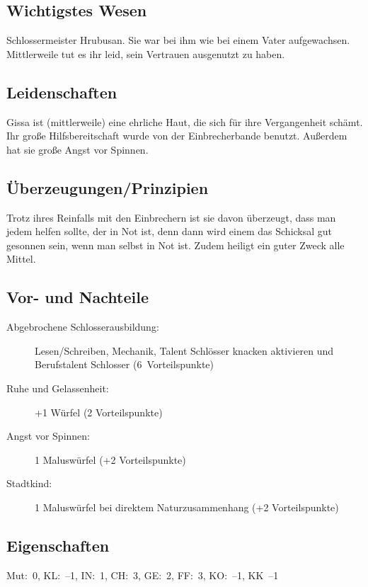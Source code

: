 \subsection{Wichtigstes Wesen}
Schlossermeister Hrubusan. Sie war bei ihm wie bei einem Vater aufgewachsen. Mittlerweile tut es ihr leid, sein Vertrauen ausgenutzt zu haben.

\subsection{Leidenschaften}
Gissa ist (mittlerweile) eine ehrliche Haut, die sich für ihre Vergangenheit schämt. Ihr große Hilfsbereitschaft wurde von der Einbrecherbande benutzt. Außerdem hat sie große Angst vor Spinnen.

\subsection{Überzeugungen/Prinzipien}
Trotz ihres Reinfalls mit den Einbrechern ist sie davon überzeugt, dass man jedem helfen sollte, der in Not ist, denn dann wird einem das Schicksal gut gesonnen sein, wenn man selbst in Not ist. Zudem heiligt ein guter Zweck alle Mittel.

\subsection{Vor- und Nachteile}
\begin{description}
\item[Abgebrochene Schlosserausbildung:] Lesen/Schreiben, Mechanik, Talent Schlösser knacken aktivieren und Berufstalent Schlosser (6~Vorteilspunkte)
\item[Ruhe und Gelassenheit:] +1 Würfel (2 Vorteilspunkte)
\item[Angst vor Spinnen:] 1 Maluswürfel (+2 Vorteilspunkte)
\item[Stadtkind:] 1 Maluswürfel bei direktem Naturzusammenhang (+2 Vorteilspunkte)

\end{description}

\subsection{Eigenschaften}
Mut:~0, KL:~--1, IN:~1, CH:~3, GE:~2, FF:~3, KO:~--1, KK~--1

